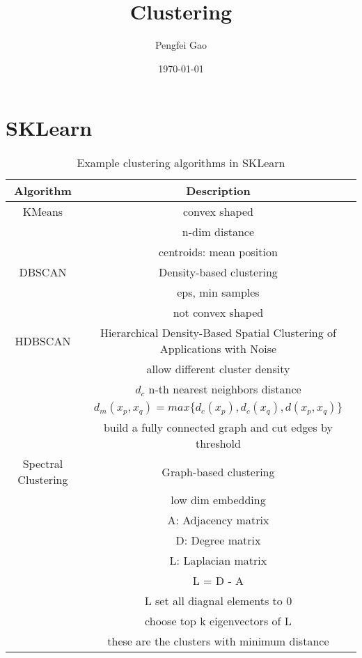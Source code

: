 \documentclass{article}
\begin{document}
\title{Clustering}
\author{Pengfei Gao}
\date{\today}
\maketitle
\tableofcontents

\section{SKLearn}

\begin{table}[h!]
\centering
\begin{tabular}{|c|c|}
\hline
Algorithm & Description \\
\hline
KMeans & convex shaped \\
 & n-dim distance\\
 & centroids: mean position \\
\hline
DBSCAN & Density-based clustering \\
& eps, min samples \\
& not convex shaped \\
\hline
HDBSCAN & Hierarchical Density-Based Spatial Clustering of Applications with Noise \\
& allow different cluster density \\
& $d_c$ n-th nearest neighbors distance \\
& $d_m(x_p, x_q) = max\{d_c(x_p), d_c(x_q), d(x_p, x_q)\}$ \\
& build a fully connected graph and cut edges by threshold \\
\hline
Spectral Clustering & Graph-based clustering \\
& low dim embedding \\
& A: Adjacency matrix \\
& D: Degree matrix \\
& L: Laplacian matrix \\
& L = D - A\\
& L set all diagnal elements to 0 \\
& choose top k eigenvectors of L \\
& these are the clusters with minimum distance \\
\end{tabular}
\caption{Example clustering algorithms in SKLearn}
\end{table}
\end{document}
